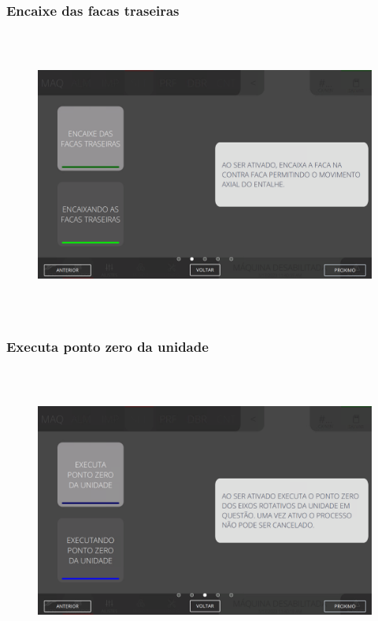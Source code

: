 \subsubsection{\small{Encaixe das facas traseiras}}\label{telaComandoSlotterEncaixeDasFacasTraseiras}
\vspace*{\fill}
\begin{figure}[h]
  \centering
  \includegraphics[width=576px,height=360px]{src/imagesFlexo/05-slotter/commands/e-2.png}
\end{figure}
\vspace*{\fill}

\newpage
\thispagestyle{fancy}
\vspace*{40 pt}
\subsubsection{\small{Executa ponto zero da unidade}}\label{telaComandoSlotterExecutaPontoZeroDaUnidade}
\vspace*{\fill}
\begin{figure}[h]
  \centering
  \includegraphics[width=576px,height=360px]{src/imagesFlexo/05-slotter/commands/e-3.png}
\end{figure}
\vspace*{\fill}


